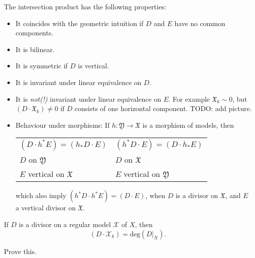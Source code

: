 The intersection product has the following properties:
\begin{itemize}
	\item It coincides with the geometric intuition if $D$ and $E$ have no common components.
	\item It is bilinear.
	\item It is symmetric if $D$ is vertical.
	\item It is invariant under linear equivalence on $D$.
	\item It is \emph{not(!)} invariant under linear equivalence on $E$.
		For example $\mathfrak{X}_{k} \sim 0$, but $(D \cdot
		\mathfrak{X}_{k}) \ne 0$ if $D$ consists of one horizontal
		component. TODO: add picture.
	\item Behaviour under morphisms: If $h \colon \mathfrak{Y} \to
		\mathfrak{X}$ is a morphism of models, then
		\begin{center}
			\begin{tabular}{ll}
				$(D \cdot h^{*}E) = (h_{*}D \cdot E)$ &
				$(h^{*}D \cdot E) = (D \cdot h_{*}E)$ \\
				$D$ on $\mathfrak{Y}$ & $D$ on $\mathfrak{X}$ \\
				$E$ vertical on $\mathfrak{X}$ & $E$ vertical on $\mathfrak{Y}$
			\end{tabular}
		\end{center}
		which also imply $(h^{*}D \cdot h^{*}E) = (D \cdot E)$, when
		$D$ is a divisor on $\mathfrak{X}$, and $E$ a vertical divisor
		on $\mathfrak{X}$.
\end{itemize}

If $D$ is a divisor on a regular model $\mathcal{X}$ of $X$, then 
\[
(D \cdot \mathcal{X}_{k}) = \mathrm{deg}(D|_{X}).
\]
\begin{exercise}
	Prove this.
\end{exercise}
